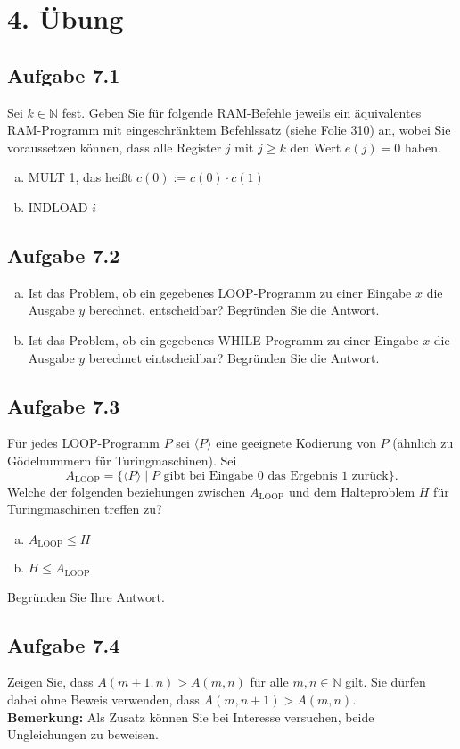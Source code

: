 \section*{4. Übung}
\subsection*{Aufgabe 7.1}
Sei $k \in \mathbb{N}$ fest. Geben Sie für folgende RAM-Befehle jeweils ein äquivalentes RAM-Programm mit eingeschränktem Befehlssatz (siehe Folie 310) an, wobei Sie voraussetzen können, dass alle Register $j$ mit $j \ge k$ den Wert $e(j) = 0$ haben.
\begin{enumerate}[(a)]
	\item MULT 1, das heißt $c(0) := c(0) \cdot c(1)$
	\item INDLOAD $i$
\end{enumerate}
\subsection*{Aufgabe 7.2}
\begin{enumerate}[(a)]
	\item Ist das Problem, ob ein gegebenes LOOP-Programm zu einer Eingabe $x$ die Ausgabe $y$ berechnet, entscheidbar? Begründen Sie die Antwort.
	\item Ist das Problem, ob ein gegebenes WHILE-Programm zu einer Eingabe $x$ die Ausgabe $y$ berechnet eintscheidbar? Begründen Sie die Antwort.
\end{enumerate}
\subsection*{Aufgabe 7.3}
Für jedes LOOP-Programm $P$ sei $\langle P \rangle$ eine geeignete Kodierung von $P$ (ähnlich zu Gödelnummern für Turingmaschinen). Sei
$$A_{ \text{LOOP} }= \{\langle P \rangle \mid P \text{ gibt bei Eingabe 0 das Ergebnis 1 zurück}\}.$$
Welche der folgenden beziehungen zwischen $A_{\text{LOOP}}$ und dem Halteproblem $H$ für Turingmaschinen treffen zu?
\begin{enumerate}[(a)]
	\item $A_{\text{LOOP}} \leq H$
	\item $H \leq A_{\text{LOOP}}$
\end{enumerate}
Begründen Sie Ihre Antwort.
\subsection*{Aufgabe 7.4}
Zeigen Sie, dass $A(m+1,n) > A(m,n)$ für alle $m,n \in \mathbb{N}$ gilt. Sie dürfen dabei ohne Beweis verwenden, dass $A(m,n+1) > A(m,n)$.\\
\textbf{Bemerkung:} Als Zusatz können Sie bei Interesse versuchen, beide Ungleichungen zu beweisen.